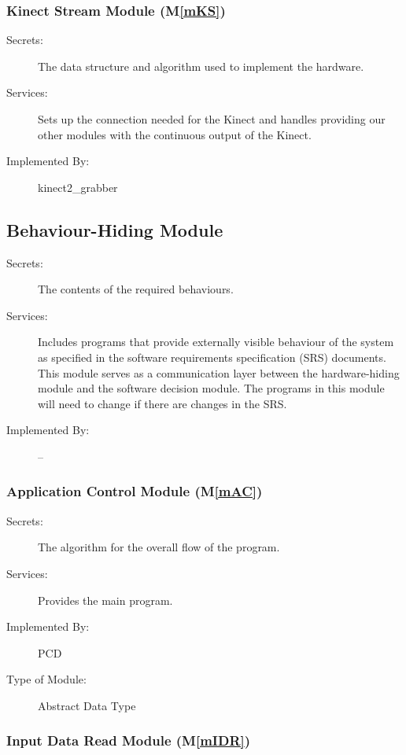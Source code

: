 \documentclass[12pt, titlepage]{article}
\newcommand{\mref}[1]{M\ref{#1}}
\begin{document}
\subsubsection{Kinect Stream Module (\mref{mKS})}

\begin{description}
\item[Secrets:]The data structure and algorithm used to implement the hardware.
\item[Services:]Sets up the connection needed for the Kinect and handles providing
  our other modules with the continuous output of the Kinect.
\item[Implemented By:] kinect2\_grabber
\end{description}

\subsection{Behaviour-Hiding Module}

\begin{description}
\item[Secrets:]The contents of the required behaviours.
\item[Services:]Includes programs that provide externally visible behaviour of
  the system as specified in the software requirements specification (SRS)
  documents. This module serves as a communication layer between the
  hardware-hiding module and the software decision module. The programs in this
  module will need to change if there are changes in the SRS.
\item[Implemented By:] --
\end{description}

\subsubsection{Application Control Module (\mref{mAC})}

\begin{description}
\item[Secrets:]The algorithm for the overall flow of the program.
\item[Services:]Provides the main program.
\item[Implemented By:]PCD
\item[Type of Module:]Abstract Data Type
\end{description}

\subsubsection{Input Data Read Module (\mref{mIDR})}
\end{document}

